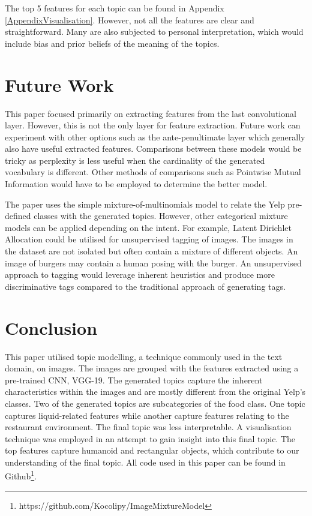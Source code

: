 \documentclass{article}
\begin{document}
The top 5 features for each topic can be found in Appendix \ref{AppendixVisualisation}. However, not all the features are clear and straightforward. Many are also subjected to personal interpretation, which would include bias and prior beliefs of the meaning of the topics.  
\section{Future Work}
This paper focused primarily on extracting features from the last convolutional layer. However, this is not the only layer for feature extraction. Future work can experiment with other options such as the ante-penultimate layer which generally also have useful extracted features. Comparisons between these models would be tricky as perplexity is less useful when the cardinality of the generated vocabulary is different. Other methods of comparisons such as Pointwise Mutual Information would have to be employed to determine the better model.

The paper uses the simple mixture-of-multinomials model to relate the Yelp pre-defined classes with the generated topics. However, other categorical mixture models can be applied depending on the intent. For example, Latent Dirichlet Allocation could be utilised for unsupervised tagging of images. The images in the dataset are not isolated but often contain a mixture of different objects. An image of burgers may contain a human posing with the burger. An unsupervised approach to tagging would leverage inherent heuristics and produce more discriminative tags compared to the traditional approach of generating tags. 

\section{Conclusion}
This paper utilised topic modelling, a technique commonly used in the text domain, on images. The images are grouped with the features extracted using a pre-trained CNN, VGG-19. The generated topics capture the inherent characteristics within the images and are mostly different from the original Yelp's classes. Two of the generated topics are subcategories of the food class. One topic captures liquid-related features while another capture features relating to the restaurant environment. The final topic was less interpretable. A visualisation technique was employed in an attempt to gain insight into this final topic. The top features capture humanoid and rectangular objects, which contribute to our understanding of the final topic. All code used in this paper can be found in Github\footnote{https://github.com/Kocolipy/ImageMixtureModel}.
\end{document}
